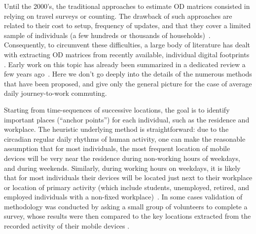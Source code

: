 


Until the 2000's, the traditional approaches to estimate OD matrices consisted in relying on travel surveys or counting. The drawback of such approaches are related to their cost to setup, frequency of updates, and that they cover a limited sample of individuals (a few hundreds or thousands of households)~\cite{iqbal_2014_development}. Consequently, to circumvent these difficulties, a large body of literature has dealt with extracting OD matrices from recently available, individual digital footprints \cite{white_2002_extracting, caceres_2007_deriving, isaacman_2010_tale, calabrese_2011_estimating, jiang_2013_review, iqbal_2014_development, lenormand_2014_cross, alexander_2015_origin, toole_2015_path}. 
Early work on this topic has already been summarized in a dedicated review a few years ago~\cite{caceres_2008_review}. Here we don't go deeply into the details of the numerous methods that have been proposed, and give only the general picture for the case of average daily journey-to-work commuting. 

Starting from time-sequences of successive locations, the goal is to identify important places (``anchor points'') for each individual, such as the residence and workplace. The heuristic underlying method is straightforward: due to the circadian regular daily rhythms of human activity, one can make the reasonable assumption that for most individuals, the most frequent location of mobile devices will be very near the residence during non-working hours of weekdays, and during weekends. Similarly, during working hours on weekdays, it is likely that for most individuals their devices will be located just next to their workplace or location of primary activity (which include students, unemployed, retired, and employed individuals with a non-fixed workplace)~\cite{tizzoni_2014_use, lenormand_2014_cross, alexander_2015_origin, toole_2015_path}. In some cases validation of methodology was conducted by asking a small group of volunteers to complete a survey, whose results were then compared to the key locations extracted from the recorded activity of their mobile devices \cite{isaacman_2010_tale}.

